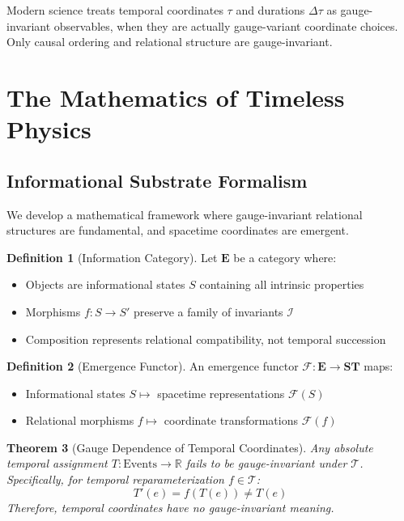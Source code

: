 \documentclass[11pt]{article}
\theoremstyle{definition}
\newtheorem{definition}{Definition}[section]
\theoremstyle{plain}
\newtheorem{theorem}[definition]{Theorem}
\theoremstyle{remark}
\newcommand{\Ecat}{\mathbf{E}}
\newcommand{\ST}{\mathbf{ST}}
\newcommand{\F}{\mathcal{F}}
\newcommand{\I}{\mathcal{I}}
\newcommand{\T}{\mathcal{T}}
\begin{document}
\begin{warning}
Modern science treats temporal coordinates $\tau$ and durations $\Delta\tau$ as gauge-invariant observables, when they are actually gauge-variant coordinate choices. Only causal ordering and relational structure are gauge-invariant.
\end{warning}

\section{The Mathematics of Timeless Physics}

\subsection{Informational Substrate Formalism}

We develop a mathematical framework where gauge-invariant relational structures are fundamental, and spacetime coordinates are emergent.

\begin{definition}[Information Category]
Let $\Ecat$ be a category where:
\begin{itemize}
\item Objects are informational states $S$ containing all intrinsic properties
\item Morphisms $f: S \to S'$ preserve a family of invariants $\I$
\item Composition represents relational compatibility, not temporal succession
\end{itemize}
\end{definition}

\begin{definition}[Emergence Functor]
An emergence functor $\F: \Ecat \to \ST$ maps:
\begin{itemize}
\item Informational states $S \mapsto$ spacetime representations $\F(S)$
\item Relational morphisms $f \mapsto$ coordinate transformations $\F(f)$
\end{itemize}
\end{definition}

\begin{theorem}[Gauge Dependence of Temporal Coordinates]
Any absolute temporal assignment $T: \text{Events} \to \mathbb{R}$ fails to be gauge-invariant under $\T$. Specifically, for temporal reparameterization $f \in \T$:
$$T'(e) = f(T(e)) \neq T(e)$$
Therefore, temporal coordinates have no gauge-invariant meaning.
\end{theorem}
\end{document}
